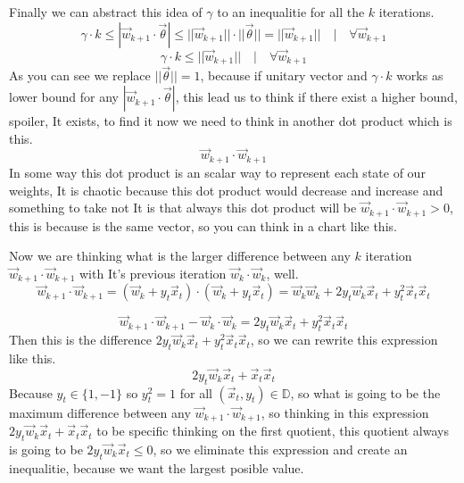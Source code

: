 \documentclass[12pt]{article}
\begin{document}
Finally we can abstract this idea of $\gamma$ to an inequalitie for all the $k$ iterations.
\[
  \gamma \cdot k \le |\vec{w}_{k+1} \cdot \vec{\theta}| \le ||\vec{w}_{k+1}||\cdot ||\vec{\theta}||
  = ||\vec{w}_{k+1}||\quad|\quad \forall \vec{w}_{k + 1}
\]
\[
  \gamma \cdot k \le ||\vec{w}_{k+1}||\quad|\quad \forall \vec{w}_{k + 1}
\]
As you can see we replace $||\vec{\theta}|| = 1$, because if unitary vector and
$\gamma \cdot k$ works as lower bound for any $|\vec{w}_{k + 1}\cdot \vec{\theta} |$, this lead us
to think if there exist a higher bound, spoiler, It exists, to find it now we need to think in another
dot product which is this.
\[
  \vec{w}_{k + 1} \cdot \vec{w}_{k+1}
\]
In some way this dot product is an scalar way to represent each state of our weights, It is chaotic
because this dot product would decrease and increase and something to take not It is that
always this dot product will be
$\vec{w}_{k + 1} \cdot \vec{w}_{k+1} > 0$, this is because is the same vector,
so you can think in a chart like this.
\begin{center}
\end{center}
Now we are thinking
what is the larger difference between
any $k$ iteration $\vec{w}_{k+1} \cdot \vec{w}_{k+1}$ with It's
previous iteration $\vec{w}_{k} \cdot \vec{w}_{k}$, well.
\[
  \vec{w}_{k + 1} \cdot \vec{w}_{k + 1} = (\vec{w}_{k} + y_t\vec{x}_t) \cdot (\vec{w}_{k} + y_t\vec{x}_t)
  = \vec{w}_k\vec{w}_k + 2y_t\vec{w}_k\vec{x}_t + y_t^2\vec{x}_t\vec{x}_t
\]

\[
  \vec{w}_{k + 1} \cdot \vec{w}_{k + 1} - \vec{w}_k \cdot \vec{w}_k
  = 2y_t\vec{w}_k\vec{x}_t + y_t^2\vec{x}_t\vec{x}_t
\]
Then this is the difference $2y_t\vec{w}_k\vec{x}_t + y_t^2\vec{x}_t\vec{x}_t$,
so we can rewrite this expression
like this.
\[
  2y_t\vec{w}_k\vec{x}_t + \vec{x}_t\vec{x}_t
\]
Because $y_t \in \{1, -1\}$ so $y_t^2 = 1$ for all $(\vec{x}_t, y_t) \in \mathbb{D}$, so what is going
to be the maximum difference between any $\vec{w}_{k+1} \cdot \vec{w}_{k+1}$, so thinking in this
expression $2y_t\vec{w}_k\vec{x}_t + \vec{x}_t\vec{x}_t$ to be specific thinking on the first quotient,
this quotient always is going to be $2y_t\vec{w}_k\vec{x}_t \le 0$, so we eliminate this
expression and create an inequalitie, because we want the largest posible value.
\end{document}
